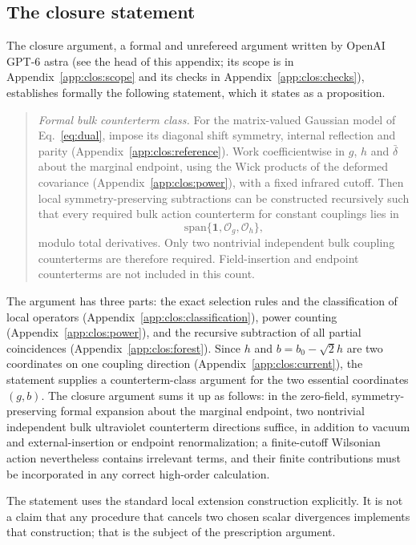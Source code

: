 \documentclass[11pt,a4paper]{article}
\numberwithin{equation}{section}
\newcommand{\db}{\bar\delta}
\newcommand{\Og}{\mathcal O_g}
\newcommand{\Oh}{\mathcal O_h}
\begin{document}
\subsection{The closure statement}\label{app:clos:closure}
The closure argument, a formal and unrefereed argument written by OpenAI GPT-6 astra (see the head of this
appendix; its scope is in Appendix~\ref{app:clos:scope} and its checks in Appendix~\ref{app:clos:checks}), establishes
formally the following statement, which it states as a proposition.
\begin{quote}
\emph{Formal bulk counterterm class.} For the matrix-valued Gaussian model of Eq.~\eqref{eq:dual}, impose its diagonal
shift symmetry, internal reflection and parity (Appendix~\ref{app:clos:reference}). Work coefficientwise in $g$, $h$
and $\db$ about the marginal endpoint, using the Wick products of the deformed covariance
(Appendix~\ref{app:clos:power}), with a fixed infrared cutoff. Then local symmetry-preserving subtractions can be
constructed recursively such that every required bulk action counterterm for constant couplings lies in
\begin{equation}
 \mathrm{span}\{\mathbf 1,\Og,\Oh\},
 \label{eq:clos:span}
\end{equation}
modulo total derivatives. Only two nontrivial independent bulk coupling counterterms are therefore required.
Field-insertion and endpoint counterterms are not included in this count.
\end{quote}
The argument has three parts: the exact selection rules and the classification of local operators
(Appendix~\ref{app:clos:classification}), power counting (Appendix~\ref{app:clos:power}), and the recursive subtraction
of all partial coincidences (Appendix~\ref{app:clos:forest}). Since $h$ and $b=b_0-\sqrt2h$ are two coordinates on one
coupling direction (Appendix~\ref{app:clos:current}), the statement supplies a counterterm-class argument for the two
essential coordinates $(g,b)$. The closure argument sums it up as follows: in the zero-field, symmetry-preserving formal
expansion about the marginal endpoint, two nontrivial independent bulk ultraviolet counterterm directions suffice, in
addition to vacuum and external-insertion or endpoint renormalization; a finite-cutoff Wilsonian action nevertheless
contains irrelevant terms, and their finite contributions must be incorporated in any correct high-order calculation.

The statement uses the standard local extension construction explicitly. It is not a claim that any procedure that
cancels two chosen scalar divergences implements that construction; that is the subject of the prescription argument.
\end{document}
